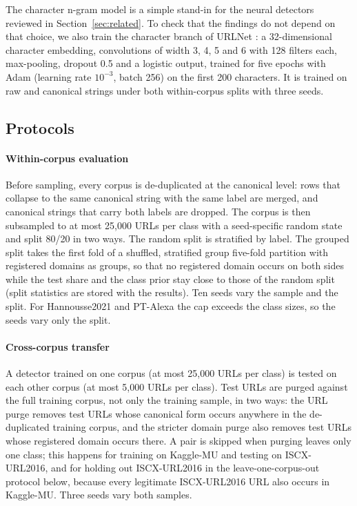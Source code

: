 The character n-gram model is a simple stand-in for the neural detectors reviewed in Section~\ref{sec:related}. To check that the findings do not depend on that choice, we also train the character branch of URLNet \citep{le2018urlnet}: a 32-dimensional character embedding, convolutions of width 3, 4, 5 and 6 with 128 filters each, max-pooling, dropout 0.5 and a logistic output, trained for five epochs with Adam (learning rate $10^{-3}$, batch 256) on the first 200 characters. It is trained on raw and canonical strings under both within-corpus splits with three seeds.

\subsection{Protocols}
\paragraph{Within-corpus evaluation} Before sampling, every corpus is de-duplicated at the canonical level: rows that collapse to the same canonical string with the same label are merged, and canonical strings that carry both labels are dropped. The corpus is then subsampled to at most 25,000 URLs per class with a seed-specific random state and split 80/20 in two ways. The random split is stratified by label. The grouped split takes the first fold of a shuffled, stratified group five-fold partition with registered domains as groups, so that no registered domain occurs on both sides while the test share and the class prior stay close to those of the random split (split statistics are stored with the results). Ten seeds vary the sample and the split. For Hannousse2021 and PT-Alexa the cap exceeds the class sizes, so the seeds vary only the split.

\paragraph{Cross-corpus transfer} A detector trained on one corpus (at most 25,000 URLs per class) is tested on each other corpus (at most 5,000 URLs per class). Test URLs are purged against the full training corpus, not only the training sample, in two ways: the URL purge removes test URLs whose canonical form occurs anywhere in the de-duplicated training corpus, and the stricter domain purge also removes test URLs whose registered domain occurs there. A pair is skipped when purging leaves only one class; this happens for training on Kaggle-MU and testing on ISCX-URL2016, and for holding out ISCX-URL2016 in the leave-one-corpus-out protocol below, because every legitimate ISCX-URL2016 URL also occurs in Kaggle-MU. Three seeds vary both samples.

